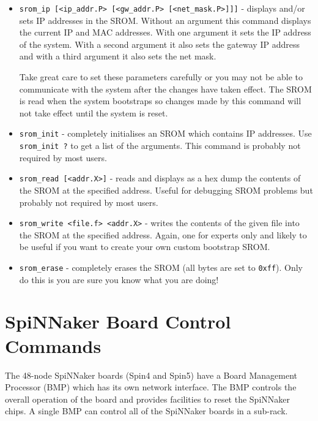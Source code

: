 \begin{itemize}

\item
\texttt{srom\_ip [<ip\_addr.P> [<gw\_addr.P> [<net\_mask.P>]]]} - 
displays and/or sets IP addresses in the SROM. Without an argument
this command displays the current IP and MAC addresses. With one
argument it sets the IP address of the system. With a second argument
it also sets the gateway IP address and with a third argument it also
sets the net mask.

Take great care to set these parameters carefully or you may not be
able to communicate with the system after the changes have taken
effect. The SROM is read when the system bootstraps so changes made by
this command will not take effect until the system is reset.

\item
\texttt{srom\_init} - completely initialises an SROM which contains
IP addresses. Use \texttt{srom\_init ?} to get a list of the
arguments. This command is probably not required by most users.

\item
\texttt{srom\_read [<addr.X>]} - reads and displays as a hex dump the
contents of the SROM at the specified address. Useful for debugging
SROM problems but probably not required by most users.

\item
\texttt{srom\_write <file.f> <addr.X>} - writes the contents of the
given file into the SROM at the specified address. Again, one for
experts only and likely to be useful if you want to create your own
custom bootstrap SROM.

\item
\texttt{srom\_erase} - completely erases the SROM (all bytes are set to
\texttt{0xff}). Only do this is you are sure you know what you are
doing!

\end{itemize}

\section{SpiNNaker Board Control Commands}

The 48-node SpiNNaker boards (Spin4 and Spin5) have a Board Management
Processor (BMP) which has its own network interface. The BMP controls
the overall operation of the board and provides facilities to reset
the SpiNNaker chips. A single BMP can control all of the SpiNNaker
boards in a sub-rack.

